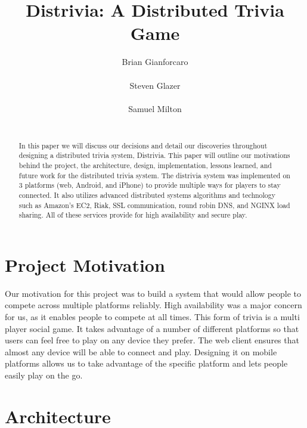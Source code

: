 \documentclass{dependencies/acm_proc_article-sp}
\begin{document}
\title{ Distrivia: A Distributed Trivia Game }
\author{
\alignauthor
Brian Gianforcaro \\
   	\\
\alignauthor
Steven Glazer \\
   	\\
\alignauthor
Samuel Milton \\
   	\\
}
\maketitle

\begin{abstract}
In this paper we will discuss our decisions and detail our discoveries throughout designing a distributed trivia system, Distrivia.
This paper will outline our motivations behind the project, the architecture, design, implementation, lessons learned, and future work for the distributed trivia system.
The distrivia system was implemented on 3 platforms (web, Android, and iPhone) to provide multiple ways for players to stay connected.
It also utilizes advanced distributed systems algorithms and technology such as Amazon's EC2, Riak, SSL communication, round robin DNS, and NGINX load sharing.
All of these services provide for high availability and secure play.
\end{abstract}

\section{Project Motivation}
Our motivation for this project was to build a system that would allow people to compete across multiple platforms reliably.
High availability was a major concern for us, as it enables people to compete at all times.
This form of trivia is a multi player social game.
It takes advantage of a number of different platforms so that users can feel free to play on any device they prefer.
The web client ensures that almost any device will be able to connect and play.
Designing it on mobile platforms allows us to take advantage of the specific platform and lets people easily play on the go.

\section{Architecture}
\end{document}
